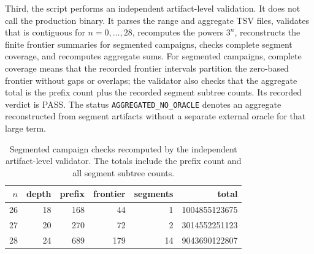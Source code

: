 \documentclass[11pt]{article}
\theoremstyle{definition}
\theoremstyle{remark}
\begin{document}
Third, the script  performs an
independent artifact-level validation.  It does not call the production
binary.  It parses the range and aggregate TSV files, validates that
 is contiguous for \(n=0,\ldots,28\), recomputes the
powers \(3^n\), reconstructs the finite frontier summaries for segmented
campaigns, checks complete segment coverage, and recomputes aggregate sums.
For segmented campaigns, complete coverage means that the recorded frontier
intervals partition the zero-based frontier without gaps or overlaps; the
validator also checks that the aggregate total is the prefix count plus the
recorded segment subtree counts.  Its recorded verdict is PASS.  The status
\texttt{AGGREGATED\_NO\_ORACLE} denotes an aggregate reconstructed from segment
artifacts without a separate external oracle for that large term.

\begin{table}[ht]
\centering
\begin{tabular}{rrrrrr}
\toprule
\(n\) & depth & prefix & frontier & segments & total \\
\midrule
26 & 18 & 168 & 44 & 1 & 1004855123675 \\
27 & 20 & 270 & 72 & 2 & 3014552251123 \\
28 & 24 & 689 & 179 & 14 & 9043690122807 \\
\bottomrule
\end{tabular}
\caption{Segmented campaign checks recomputed by the independent artifact-level
validator.  The totals include the prefix count and all segment subtree counts.}
\label{tab:segment-checks}
\end{table}
\end{document}
